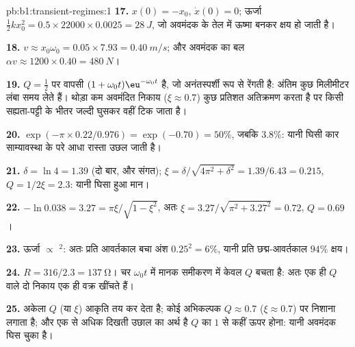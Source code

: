 \begin{solution}{pb:b1:transient-regimes:1}
\textbf{17.} $x(0) = -x_0$, $\dot x(0) = 0$; ऊर्जा $\tfrac12 kx_0^2 =
0.5 \times 22000 \times 0.0025 = \qty{28}{J}$, जो अवमंदक के तेल में ऊष्मा
बनकर क्षय हो जाती है।

\textbf{18.} $v \approx x_0\omega_0 = 0.05 \times 7.93 = \qty{0.40}{m/s}$;
और अवमंदक का बल $\alpha v \approx 1200 \times 0.40 = \qty{480}{N}$।

\textbf{19.} $Q = \tfrac12$ पर वापसी $(1 + \omega_0 t)\eu^{-\omega_0
t}$ है, जो अनंतस्पर्शी रूप से रेंगती है: अंतिम कुछ मिलीमीटर लंबा समय लेते हैं।
थोड़ा कम अवमंदित निकाय ($\xi \approx 0.7$) कुछ प्रतिशत अतिक्रमण करता है पर
किसी सह्यता-पट्टी के भीतर जल्दी घुसकर वहीं टिक जाता है।

\textbf{20.} $\exp(-\pi \times 0.22/0.976) = \exp(-0.70) = 50\%$, जबकि
$3.8\%$: यानी घिसी कार साम्यावस्था के परे आधा रास्ता उछल जाती है।

\textbf{21.} $\delta = \ln 4 = 1.39$ (दो बार, और संगत); $\xi =
\delta/\sqrt{4\pi^2 + \delta^2} = 1.39/6.43 = 0.215$, $Q = 1/2\xi = 2.3$:
यानी घिसा हुआ मान।

\textbf{22.} $-\ln 0.038 = 3.27 = \pi\xi/\sqrt{1 - \xi^2}$, अतः $\xi =
3.27/\sqrt{\pi^2 + 3.27^2} = 0.72$, $Q = 0.69$।

\textbf{23.} ऊर्जा $\propto$ $^2$: अतः प्रति आवर्तकाल बचा अंश
$0.25^2 = 6\%$, यानी प्रति छद्म-आवर्तकाल $94\%$ क्षय।

\textbf{24.} $R = 316/2.3 = \qty{137}{\ohm}$। चर $\omega_0 t$
में मानक समीकरण में केवल $Q$ बचता है: अतः एक ही $Q$ वाले दो निकाय एक ही वक्र
खींचते हैं।

\textbf{25.} अकेला  $Q$ (या $\xi$) आकृति तय कर देता है; कोई
अभिकल्पक $Q \approx 0.7$ ($\xi \approx 0.7$) पर निशाना लगाता है; और एक से
अधिक दिखती उछाल का अर्थ है $Q$ का $1$ से कहीं ऊपर होना: यानी अवमंदक घिस चुका है।
\end{solution}
